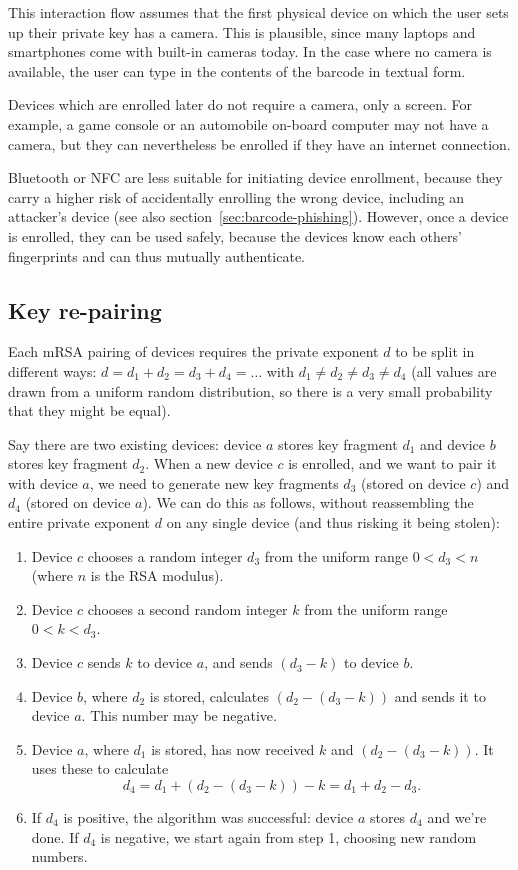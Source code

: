 This interaction flow assumes that the first physical device on which the user sets up their private
key has a camera. This is plausible, since many laptops and smartphones come with built-in cameras
today. In the case where no camera is available, the user can type in the contents of the barcode in
textual form.

Devices which are enrolled later do not require a camera, only a screen. For example, a game console
or an automobile on-board computer may not have a camera, but they can nevertheless be enrolled if
they have an internet connection.

Bluetooth or NFC are less suitable for initiating device enrollment, because they carry a higher
risk of accidentally enrolling the wrong device, including an attacker's device (see also
section~\ref{sec:barcode-phishing}). However, once a device is enrolled, they can be used safely,
because the devices know each others' fingerprints and can thus mutually authenticate.

\subsection{Key re-pairing}\label{sec:pairing}

Each mRSA pairing of devices requires the private exponent $d$ to be split in different ways:
$d = d_1 + d_2 = d_3 + d_4 = \dots$ with $d_1 \neq d_2 \neq d_3 \neq d_4$ (all values are drawn from
a uniform random distribution, so there is a very small probability that they might be equal).

Say there are two existing devices: device $a$ stores key fragment $d_1$ and device $b$ stores key
fragment $d_2$. When a new device $c$ is enrolled, and we want to pair it with device $a$, we need
to generate new key fragments $d_3$ (stored on device $c$) and $d_4$ (stored on device $a$). We can
do this as follows, without reassembling the entire private exponent $d$ on any single device (and
thus risking it being stolen):

\begin{enumerate}
\item Device $c$ chooses a random integer $d_3$ from the uniform range $0 < d_3 < n$ (where $n$ is
the RSA modulus).
\item Device $c$ chooses a second random integer $k$ from the uniform range $0 < k < d_3$.
\item Device $c$ sends $k$ to device $a$, and sends $(d_3 - k)$ to device $b$.
\item Device $b$, where $d_2$ is stored, calculates $(d_2 - (d_3 - k))$ and sends it to device $a$.
This number may be negative.
\item Device $a$, where $d_1$ is stored, has now received $k$ and $(d_2 - (d_3 - k))$. It uses these
to calculate $$d_4 = d_1 + (d_2 - (d_3 - k)) - k = d_1 + d_2 - d_3.$$
\item If $d_4$ is positive, the algorithm was successful: device $a$ stores $d_4$ and we're done. If
$d_4$ is negative, we start again from step 1, choosing new random numbers.
\end{enumerate}

